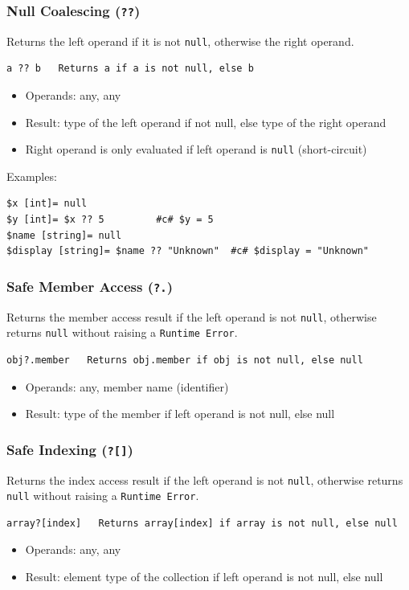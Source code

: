 \subsubsection{Null Coalescing (\texttt{??})}
Returns the left operand if it is not \texttt{null}, otherwise the right operand.
\begin{verbatim}
a ?? b   Returns a if a is not null, else b
\end{verbatim}
\begin{itemize}
\item Operands: any, any
\item Result: type of the left operand if not null, else type of the right operand
\item Right operand is only evaluated if left operand is \texttt{null} (short-circuit)
\end{itemize}

Examples:
\begin{verbatim}
$x [int]= null
$y [int]= $x ?? 5         #c# $y = 5
$name [string]= null
$display [string]= $name ?? "Unknown"  #c# $display = "Unknown"
\end{verbatim}

\subsubsection{Safe Member Access (\texttt{?.})}
Returns the member access result if the left operand is not \texttt{null}, otherwise returns \texttt{null} without raising a \texttt{Runtime Error}.
\begin{verbatim}
obj?.member   Returns obj.member if obj is not null, else null
\end{verbatim}
\begin{itemize}
\item Operands: any, member name (identifier)
\item Result: type of the member if left operand is not null, else null
\end{itemize}

\subsubsection{Safe Indexing (\texttt{?[]})}
Returns the index access result if the left operand is not \texttt{null}, otherwise returns \texttt{null} without raising a \texttt{Runtime Error}.
\begin{verbatim}
array?[index]   Returns array[index] if array is not null, else null
\end{verbatim}
\begin{itemize}
\item Operands: any, any
\item Result: element type of the collection if left operand is not null, else null
\end{itemize}

